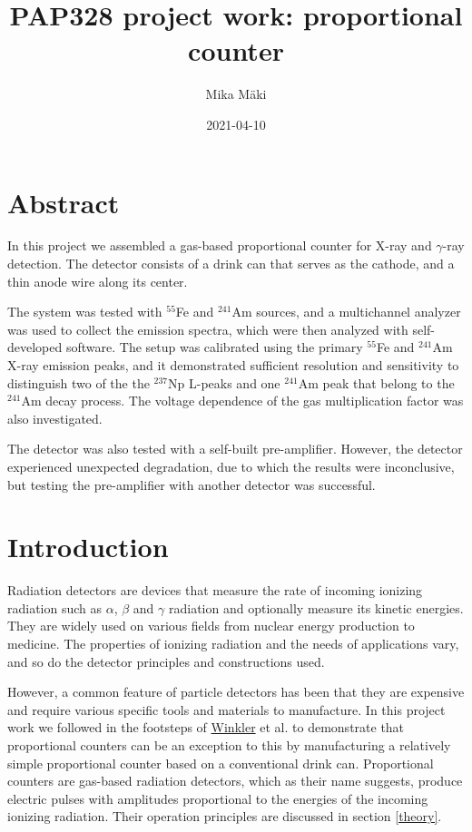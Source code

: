 \documentclass[a4paper]{article}
\title{PAP328 project work: proportional counter}
\author{Mika Mäki}
\date{2021-04-10}
\begin{document}
\maketitle

\section*{Abstract}
In this project we assembled a gas-based proportional counter for X-ray and $\gamma$-ray detection.
The detector consists of a drink can that serves as the cathode, and a thin anode wire along its center.


The system was tested with $^{55}$Fe and $^{241}$Am sources, and a multichannel analyzer was used to collect the emission spectra, which were then analyzed with self-developed software.
The setup was calibrated using the primary $^{55}$Fe and $^{241}$Am X-ray emission peaks, and it demonstrated sufficient resolution  and sensitivity to distinguish two of the the $^{237}$Np L-peaks and one $^{241}$Am peak that belong to the $^{241}$Am decay process.
The voltage dependence of the gas multiplication factor was also investigated.

The detector was also tested with a self-built pre-amplifier.
However, the detector experienced unexpected degradation, due to which the results were inconclusive, but testing the pre-amplifier with another detector was successful.

\tableofcontents


\section{Introduction}
\label{introduction}
Radiation detectors are devices that measure the rate of incoming ionizing radiation such as $\alpha$, $\beta$ and $\gamma$ radiation and optionally measure its kinetic energies.
They are widely used on various fields from nuclear energy production to medicine.
The properties of ionizing radiation and the needs of applications vary, and so do the detector principles and constructions used.

However, a common feature of particle detectors has been that they are expensive and require various specific tools and materials to manufacture.
In this project work we followed in the footsteps of
\href{https://www.helsinki.fi/en/people/people-finder/alexander-winkler-9110087}{Winkler}
et al. \cite{winkler_gaseous_2015} to demonstrate that proportional counters can be an exception to this by manufacturing a relatively simple proportional counter based on a conventional drink can.
Proportional counters are gas-based radiation detectors, which as their name suggests, produce electric pulses with amplitudes proportional to the energies of the incoming ionizing radiation.
Their operation principles are discussed in section \ref{theory}.
\end{document}
